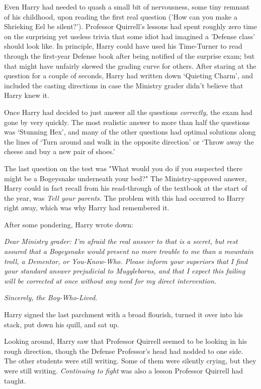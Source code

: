 Even Harry had needed to quash a small bit of nervousness, some tiny remnant of 
his childhood, upon reading the first real question ('How can you make a 
Shrieking Eel be silent?'). Professor Quirrell's lessons had spent roughly zero 
time on the surprising yet useless trivia that some idiot had imagined a 
'Defense class' should look like. In principle, Harry could have used his 
Time-Turner to read through the first-year Defense book after being notified of 
the surprise exam; but that might have unfairly skewed the grading curve for 
others. After staring at the question for a couple of seconds, Harry had 
written down `Quieting Charm', and included the casting directions in case the 
Ministry grader didn't believe that Harry knew it.

Once Harry had decided to just answer all the questions \emph{correctly,} the 
exam had gone by very quickly. The most realistic answer to more than half the 
questions was `Stunning Hex', and many of the other questions had optimal 
solutions along the lines of `Turn around and walk in the opposite direction' 
or `Throw away the cheese and buy a new pair of shoes.'

The last question on the test was "What would you do if you suspected there 
might be a Bogeysnake underneath your bed?" The Ministry-approved answer, Harry 
could in fact recall from his read-through of the textbook at the start of the 
year, was \emph{Tell your parents.} The problem with this had occurred to Harry 
right away, which was why Harry had remembered it.

After some pondering, Harry wrote down:

\emph{Dear Ministry grader: I'm afraid the real answer to that is a secret, but 
rest assured that a Bogeysnake would present no more trouble to me than a 
mountain troll, a Dementor, or You-Know-Who. Please inform your superiors that 
I find your standard answer prejudicial to Muggleborns, and that I expect this 
failing will be corrected at once without any need for my direct intervention.}

\emph{Sincerely, the Boy-Who-Lived.}

Harry signed the last parchment with a broad flourish, turned it over into his 
stack, put down his quill, and sat up.

Looking around, Harry saw that Professor Quirrell seemed to be looking in his 
rough direction, though the Defense Professor's head had nodded to one side. 
The other students were still writing. Some of them were silently crying, but 
they were still writing. \emph{Continuing to fight} was also a lesson Professor 
Quirrell had taught.

